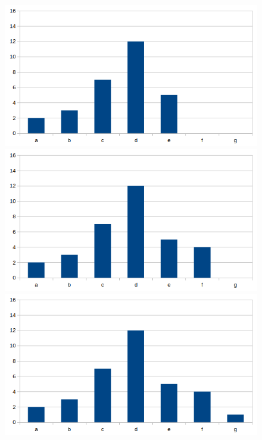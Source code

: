 \documentclass{beamer}
\begin{document}
\begin{frame}
\begin{figure}
	 {\includegraphics[scale=0.70]{a5}}
	\only<6> {\includegraphics[scale=0.70]{a6}}
	\only<7> {\includegraphics[scale=0.70]{a7}}
	\only<8> { }	
	\end{figure}

\end{frame}
\end{document}
